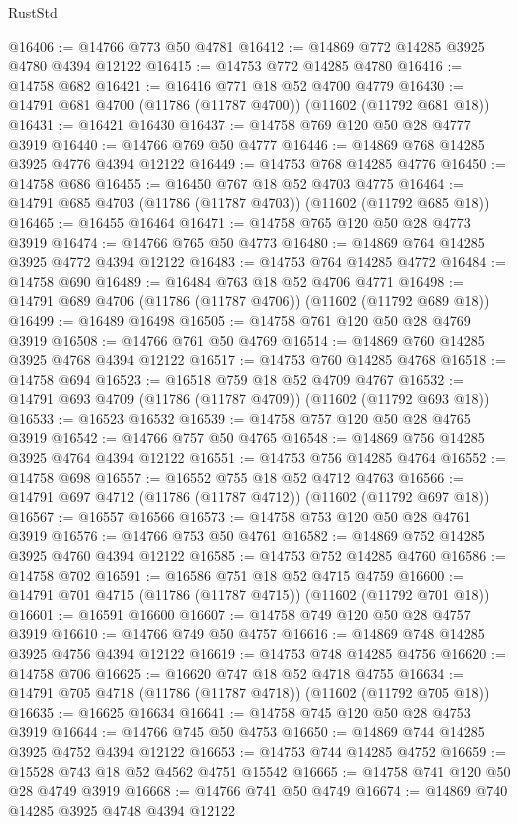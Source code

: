 \begin{lexlean}{RustStd}
\begin{coremodule}
@16406 := @14766 @773 @50 @4781
@16412 := @14869 @772 @14285 @3925 @4780 @4394 @12122
@16415 := @14753 @772 @14285 @4780
@16416 := @14758 @682
@16421 := @16416 @771 @18 @52 @4700 @4779
@16430 := @14791 @681 @4700 (@11786 (@11787 @4700)) (@11602 (@11792 @681 @18))
@16431 := @16421 @16430
@16437 := @14758 @769 @120 @50 @28 @4777 @3919
@16440 := @14766 @769 @50 @4777
@16446 := @14869 @768 @14285 @3925 @4776 @4394 @12122
@16449 := @14753 @768 @14285 @4776
@16450 := @14758 @686
@16455 := @16450 @767 @18 @52 @4703 @4775
@16464 := @14791 @685 @4703 (@11786 (@11787 @4703)) (@11602 (@11792 @685 @18))
@16465 := @16455 @16464
@16471 := @14758 @765 @120 @50 @28 @4773 @3919
@16474 := @14766 @765 @50 @4773
@16480 := @14869 @764 @14285 @3925 @4772 @4394 @12122
@16483 := @14753 @764 @14285 @4772
@16484 := @14758 @690
@16489 := @16484 @763 @18 @52 @4706 @4771
@16498 := @14791 @689 @4706 (@11786 (@11787 @4706)) (@11602 (@11792 @689 @18))
@16499 := @16489 @16498
@16505 := @14758 @761 @120 @50 @28 @4769 @3919
@16508 := @14766 @761 @50 @4769
@16514 := @14869 @760 @14285 @3925 @4768 @4394 @12122
@16517 := @14753 @760 @14285 @4768
@16518 := @14758 @694
@16523 := @16518 @759 @18 @52 @4709 @4767
@16532 := @14791 @693 @4709 (@11786 (@11787 @4709)) (@11602 (@11792 @693 @18))
@16533 := @16523 @16532
@16539 := @14758 @757 @120 @50 @28 @4765 @3919
@16542 := @14766 @757 @50 @4765
@16548 := @14869 @756 @14285 @3925 @4764 @4394 @12122
@16551 := @14753 @756 @14285 @4764
@16552 := @14758 @698
@16557 := @16552 @755 @18 @52 @4712 @4763
@16566 := @14791 @697 @4712 (@11786 (@11787 @4712)) (@11602 (@11792 @697 @18))
@16567 := @16557 @16566
@16573 := @14758 @753 @120 @50 @28 @4761 @3919
@16576 := @14766 @753 @50 @4761
@16582 := @14869 @752 @14285 @3925 @4760 @4394 @12122
@16585 := @14753 @752 @14285 @4760
@16586 := @14758 @702
@16591 := @16586 @751 @18 @52 @4715 @4759
@16600 := @14791 @701 @4715 (@11786 (@11787 @4715)) (@11602 (@11792 @701 @18))
@16601 := @16591 @16600
@16607 := @14758 @749 @120 @50 @28 @4757 @3919
@16610 := @14766 @749 @50 @4757
@16616 := @14869 @748 @14285 @3925 @4756 @4394 @12122
@16619 := @14753 @748 @14285 @4756
@16620 := @14758 @706
@16625 := @16620 @747 @18 @52 @4718 @4755
@16634 := @14791 @705 @4718 (@11786 (@11787 @4718)) (@11602 (@11792 @705 @18))
@16635 := @16625 @16634
@16641 := @14758 @745 @120 @50 @28 @4753 @3919
@16644 := @14766 @745 @50 @4753
@16650 := @14869 @744 @14285 @3925 @4752 @4394 @12122
@16653 := @14753 @744 @14285 @4752
@16659 := @15528 @743 @18 @52 @4562 @4751 @15542
@16665 := @14758 @741 @120 @50 @28 @4749 @3919
@16668 := @14766 @741 @50 @4749
@16674 := @14869 @740 @14285 @3925 @4748 @4394 @12122

\end{coremodule}
\end{lexlean}
